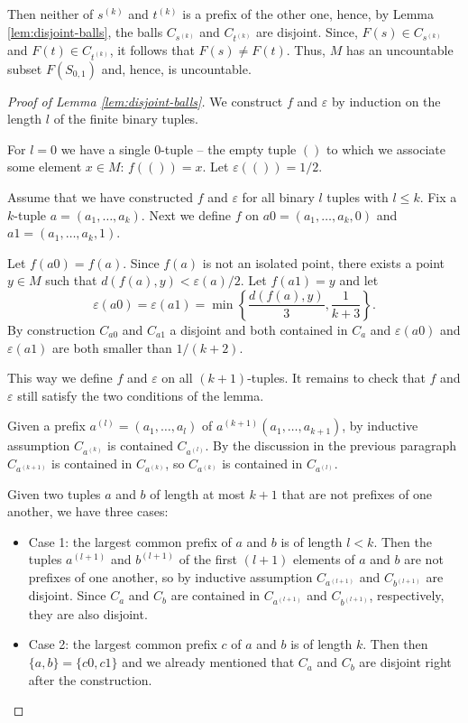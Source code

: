 \documentclass[12pt]{article}
\newcommand\bi{\begin{itemize}}
\newcommand\ei{\end{itemize}}
\renewcommand\|{\ | \ }
\newcommand\e\varepsilon
\begin{document}
Then neither of $s^{(k)}$ and $t^{(k)}$ is a prefix of the other one,
hence, by Lemma \ref{lem:disjoint-balls}, the balls 
$C_{s^{(k)}}$ and $C_{t^{(k)}}$ are disjoint. Since,
$F(s) \in C_{s^{(k)}}$ and $F(t) \in C_{t^{(k)}}$, it follows that
$F(s) \neq F(t)$. Thus, $M$ has an uncountable subset
$F(S_{0, 1})$ and, hence, is uncountable.

\begin{proof}[Proof of Lemma \ref{lem:disjoint-balls}]
We construct $f$ and $\e$ by induction on the length $l$ of the finite 
binary tuples.

For $l = 0$ we have a single 0-tuple -- the empty tuple
$()$ to which we associate some element $x \in M$: $f(()) = x$. 
Let $\e(()) = 1/2$. 

Assume that we have constructed $f$ and $\e$ for all binary 
$l$ tuples with $l\leq k$. Fix a $k$-tuple $a = (a_1, \ldots, a_k)$. 
Next we define $f$ on $a0 = (a_1, \ldots, a_k, 0)$ and 
$a1 = (a_1, \ldots, a_k, 1)$. 

Let $f(a0) = f(a)$. Since $f(a)$ is not an isolated point, there 
exists a point $y \in M$ such that $d(f(a), y) < \e(a)/2$. 
Let $f(a1) = y$ and let 
\[
\e(a0) = \e(a1) = \min\left\{\frac {d(f(a), y)} 3, \frac 1 {k + 3} \right\}.
\]
By construction $C_{a0}$ and $C_{a1}$ a disjoint and both contained in $C_a$
and $\e(a0)$ and $\e(a1)$ are both smaller than $1 / (k + 2)$.

This way we define $f$ and $\e$ on all $(k + 1)$-tuples. It remains to
check that $f$ and $\e$ still satisfy the two conditions of the lemma.

Given a prefix $a^{(l)}=(a_1, \ldots, a_l)$ of 
$a^{(k + 1)}(a_1, \ldots, a_{k + 1})$, 
by inductive assumption $C_{a^{(k)}}$ is contained $C_{a^{(l)}}$.
By the discussion in the previous paragraph $C_{a^{(k + 1)}}$
is contained in $C_{a^{(k)}}$, so $C_{a^{(k)}}$ is contained in
$C_{a^{(l)}}$. 

Given two tuples $a$ and $b$ of length at most $k + 1$ that are not 
prefixes of one another, we have three cases:
\bi
\item Case 1: the largest common prefix of $a$ and $b$ is of length $l < k$.
Then the tuples $a^{(l + 1)}$ and $b^{(l + 1)}$ of the first $(l + 1)$
elements of $a$ and $b$ are not prefixes of one another, so by inductive
assumption
$C_{a^{(l + 1)}}$ and $C_{b^{(l + 1)}}$ are disjoint. Since 
$C_a$ and $C_b$ are contained in $C_{a^{(l + 1)}}$ and $C_{b^{(l + 1)}}$,
respectively, they are also disjoint.
\item Case 2: the largest common prefix $c$ of $a$ and $b$ is of length $k$.
Then then $\{a, b\} = \{c0, c1\}$ and we already mentioned that
$C_a$ and $C_b$ are disjoint right after the construction.
\ei
\end{proof}
\end{document}
